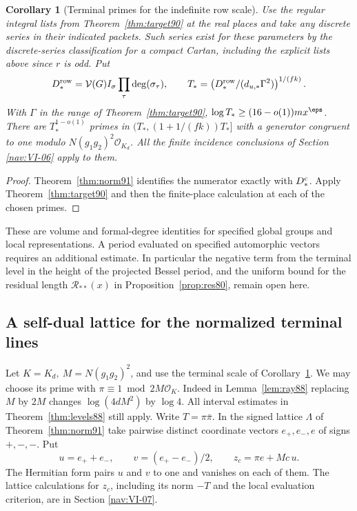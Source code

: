 \documentclass[a4paper,11pt]{article}
\newtheorem{corollary}[proposition]{Corollary}
\theoremstyle{definition}
\theoremstyle{remark}
\numberwithin{equation}{section}
\begin{document}
\begin{corollary}[Terminal primes for the indefinite row scale]
\label{cor:real91}
Use the regular integral lists from Theorem~\ref{thm:target90}
at the real places and take any discrete series in their
indicated packets. Such series exist for these parameters by
the discrete-series classification for a compact Cartan,
including the explicit lists above since \(r\) is odd. Put
\[
       D_*^{\rm row}=\mathcal V(G) I_\sigma
                    \prod_{\tau}\deg(\sigma_\tau),\qquad
       T_*=\left(D_*^{\rm row}/(d_{u,*}\Gamma^2)\right)^{1/(fk)} .
\]
With \(\Gamma\) in the range of Theorem~\ref{thm:target90},
\(\log T_*\ge(16-o(1))m x^\eps\). There are \(T_*^{1-o(1)}\)
primes in \((T_*,(1+1/(fk))T_*]\) with a generator congruent
to one modulo \(N(g_1g_2)^2\mathcal O_{K_d}\). All the finite
incidence conclusions of Section \ref{nav:VI-06} apply to them.
\end{corollary}
\begin{proof}
Theorem~\ref{thm:norm91} identifies the numerator exactly with
\(D_*^{\rm c}\). Apply Theorem~\ref{thm:target90} and then the
finite-place calculation at each of the chosen primes.
\end{proof}

These are volume and formal-degree identities for specified
global groups and local representations. A period evaluated on
specified automorphic vectors requires an additional estimate.
In particular the negative term from the terminal level in
the height of the projected Bessel period, and the uniform
bound for the residual length \(\mathcal R_{**}(x)\) in
Proposition~\ref{prop:res80}, remain open here.

\subsection{A self-dual lattice for the normalized terminal lines}\label{nav:VI-23}
Let \(K=K_d,\ M=N(g_1g_2)^2\), and use the terminal scale of
Corollary~\ref{cor:real91}. We may choose its prime with
\(\pi\equiv1\bmod 2M\mathcal O_K\). Indeed in
Lemma~\ref{lem:ray88} replacing \(M\) by \(2M\) changes
\(\log(4dM^2)\) by \(\log4\). All interval estimates in
Theorem~\ref{thm:levels88} still apply.
Write \(T=\pi\bar\pi\). In the signed lattice \(\Lambda\) of
Theorem~\ref{thm:norm91} take pairwise distinct coordinate
vectors \(e_+,e_-,e\) of signs \(+,-,-\). Put
\[
     u=e_++e_-,\qquad v=(e_+-e_-)/2,\qquad z_c=\pi e+Mc\,u .
\]
The Hermitian form pairs \(u\) and \(v\) to one and vanishes
on each of them. The lattice calculations for \(z_c\), including
its norm \(-T\) and the local evaluation criterion, are in
Section \ref{nav:VI-07}.
\end{document}
